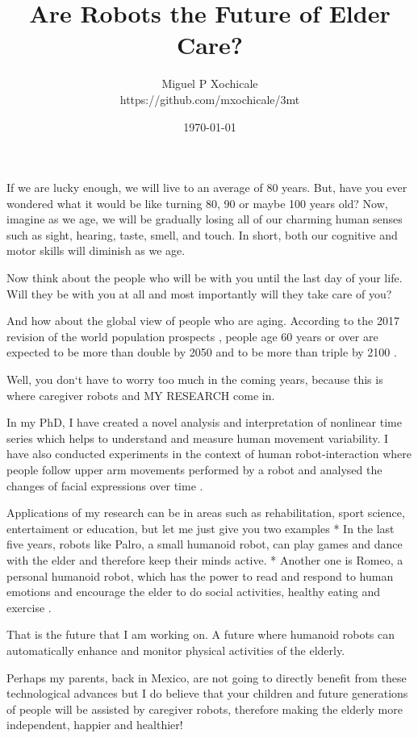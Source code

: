 \documentclass[12pt]{article}
\title{ Are Robots the Future of Elder Care?  }
\author{Miguel P Xochicale \\
https://github.com/mxochicale/3mt}
\date{\today}
\begin{document}
\maketitle

If we are lucky enough, we will live to an average of 80 years.
But, have you ever wondered what it would be like turning 80, 90 or maybe 100 years old?
Now, imagine as we age, we will be gradually losing all of our
charming human senses such as sight, hearing, taste, smell, and touch.
In short, both our cognitive and motor skills will diminish as we age.

Now think about the people who will be with you until the last day of your life.
Will they be with you at all 
and most importantly will they take care of you?

And how about the global view of people who are aging.
According to the 2017 revision of the world population prospects \cite{un2017}, 
people age 60 years or over
are expected to be more than double by 2050 and to be more than triple by 2100 \cite{unb2017}.

Well, you don`t have to worry too much in the coming years, 
because this is where caregiver robots and MY RESEARCH come in.

In my PhD, 
I have created a novel analysis and interpretation of nonlinear time series 
which helps to understand and measure human movement variability.
I have also conducted experiments in the context of human robot-interaction 
where people follow upper arm movements performed by a robot
and analysed the changes of facial expressions over time \cite{xochicale2018}.

Applications of my research can be in areas such as
rehabilitation, sport science, entertaiment or education,
but let me just give you two examples
* In the last five years,
robots like Palro, a small humanoid robot, can play games and dance with the elder
and therefore keep their minds active.
* Another one is Romeo, a personal humanoid robot, which has the power 
to read and respond to human emotions \cite{hay2015} 
and encourage the elder to do social activities, healthy eating and exercise \cite{aronson2014}.

That is the future that I am working on.
A future where humanoid robots can automatically enhance and monitor physical activities of the elderly.

Perhaps my parents, back in Mexico, are not going to directly benefit 
from these technological advances 
but I do believe that 
your children and 
future generations of people
will be assisted by caregiver robots,
therefore making the elderly more independent, happier and healthier!
\end{document}
